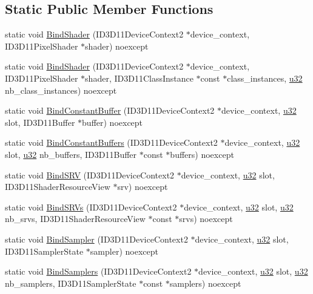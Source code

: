 \subsection*{Static Public Member Functions}
\begin{DoxyCompactItemize}
\item 
static void \hyperlink{structmage_1_1_pipeline_1_1_p_s_acd52254650845fa7764bd885b057f911}{Bind\+Shader} (I\+D3\+D11\+Device\+Context2 $\ast$device\+\_\+context, I\+D3\+D11\+Pixel\+Shader $\ast$shader) noexcept
\item 
static void \hyperlink{structmage_1_1_pipeline_1_1_p_s_adfcbd49468ab92c1c553fdadb3159cbc}{Bind\+Shader} (I\+D3\+D11\+Device\+Context2 $\ast$device\+\_\+context, I\+D3\+D11\+Pixel\+Shader $\ast$shader, I\+D3\+D11\+Class\+Instance $\ast$const $\ast$class\+\_\+instances, \hyperlink{namespacemage_af2b398bf98eb10351f49cad73fe2cc73}{u32} nb\+\_\+class\+\_\+instances) noexcept
\item 
static void \hyperlink{structmage_1_1_pipeline_1_1_p_s_a3064e4eb325269ac514a7693cf1b6e33}{Bind\+Constant\+Buffer} (I\+D3\+D11\+Device\+Context2 $\ast$device\+\_\+context, \hyperlink{namespacemage_af2b398bf98eb10351f49cad73fe2cc73}{u32} slot, I\+D3\+D11\+Buffer $\ast$buffer) noexcept
\item 
static void \hyperlink{structmage_1_1_pipeline_1_1_p_s_a21ddd625221328ef42d33e5c3dcd4709}{Bind\+Constant\+Buffers} (I\+D3\+D11\+Device\+Context2 $\ast$device\+\_\+context, \hyperlink{namespacemage_af2b398bf98eb10351f49cad73fe2cc73}{u32} slot, \hyperlink{namespacemage_af2b398bf98eb10351f49cad73fe2cc73}{u32} nb\+\_\+buffers, I\+D3\+D11\+Buffer $\ast$const $\ast$buffers) noexcept
\item 
static void \hyperlink{structmage_1_1_pipeline_1_1_p_s_a72863b788bbf51b5c03dc41fa07e3e5d}{Bind\+S\+RV} (I\+D3\+D11\+Device\+Context2 $\ast$device\+\_\+context, \hyperlink{namespacemage_af2b398bf98eb10351f49cad73fe2cc73}{u32} slot, I\+D3\+D11\+Shader\+Resource\+View $\ast$srv) noexcept
\item 
static void \hyperlink{structmage_1_1_pipeline_1_1_p_s_a0e2233bb3e78530f0dae0456cca5492f}{Bind\+S\+R\+Vs} (I\+D3\+D11\+Device\+Context2 $\ast$device\+\_\+context, \hyperlink{namespacemage_af2b398bf98eb10351f49cad73fe2cc73}{u32} slot, \hyperlink{namespacemage_af2b398bf98eb10351f49cad73fe2cc73}{u32} nb\+\_\+srvs, I\+D3\+D11\+Shader\+Resource\+View $\ast$const $\ast$srvs) noexcept
\item 
static void \hyperlink{structmage_1_1_pipeline_1_1_p_s_ae6b152708189fdce88b7587a8927195f}{Bind\+Sampler} (I\+D3\+D11\+Device\+Context2 $\ast$device\+\_\+context, \hyperlink{namespacemage_af2b398bf98eb10351f49cad73fe2cc73}{u32} slot, I\+D3\+D11\+Sampler\+State $\ast$sampler) noexcept
\item 
static void \hyperlink{structmage_1_1_pipeline_1_1_p_s_abfc3c8b71856c62926d5c343849b87c7}{Bind\+Samplers} (I\+D3\+D11\+Device\+Context2 $\ast$device\+\_\+context, \hyperlink{namespacemage_af2b398bf98eb10351f49cad73fe2cc73}{u32} slot, \hyperlink{namespacemage_af2b398bf98eb10351f49cad73fe2cc73}{u32} nb\+\_\+samplers, I\+D3\+D11\+Sampler\+State $\ast$const $\ast$samplers) noexcept
\end{DoxyCompactItemize}
